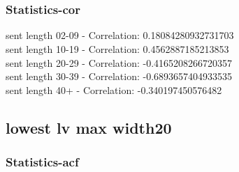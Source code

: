 \documentclass{article}%
\begin{document}
\begin{figure}[ht]%
\centering%
\setlength{\abovecaptionskip}{-35pt}%
%
%
\\%
%
%
\\%
%
\end{figure}

%
\newpage%
\subsubsection{Statistics{-}cor}%
\label{ssubsec:Statistics{-}cor}%
\noindent%
sent length 02-09 - Correlation: 0.18084280932731703\\%
sent length 10-19 - Correlation: 0.4562887185213853\\%
sent length 20-29 - Correlation: -0.4165208266720357\\%
sent length 30-39 - Correlation: -0.6893657404933535\\%
sent length 40+ - Correlation: -0.340197450576482\\

%
\newpage

%
\subsection{lowest lv max width20}%
\label{subsec:lowestlvmaxwidth20}%
\subsubsection{Statistics{-}acf}%
\label{ssubsec:Statistics{-}acf}%
\end{document}
